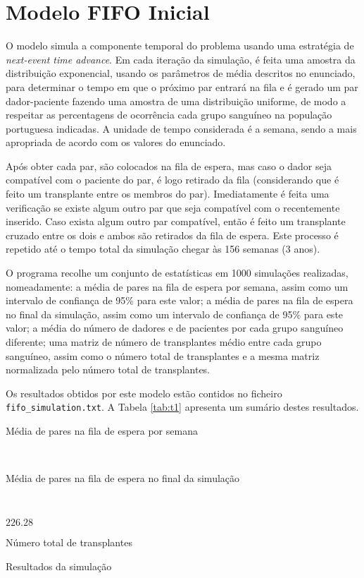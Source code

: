 \documentclass[10pt,a4paper,oneside]{article}
\begin{document}
\section{Modelo FIFO Inicial}
\label{sec:model1}

O modelo simula a componente temporal do problema usando uma
estratégia de \textit{next-event time advance}. Em cada iteração da
simulação, é feita uma amostra da distribuição exponencial, usando os
parâmetros de média descritos no enunciado, para determinar o tempo em
que o próximo par entrará na fila e é gerado um par dador-paciente
fazendo uma amostra de uma distribuição uniforme, de modo a respeitar
as percentagens de ocorrência cada grupo sanguíneo na população
portuguesa indicadas. A unidade de tempo considerada é a semana, sendo
a mais apropriada de acordo com os valores do enunciado.

Após obter cada par, são colocados na fila de espera, mas caso o dador
seja compatível com o paciente do par, é logo retirado da fila
(considerando que é feito um transplante entre os membros do
par). Imediatamente é feita uma verificação se existe algum outro par
que seja compatível com o recentemente inserido. Caso exista algum
outro par compatível, então é feito um transplante cruzado entre os
dois e ambos são retirados da fila de espera. Este processo é repetido
até o tempo total da simulação chegar às 156 semanas (3 anos).

O programa recolhe um conjunto de estatísticas em 1000 simulações
realizadas, nomeadamente: a média de pares na fila de espera por
semana, assim como um intervalo de confiança de 95\% para este valor;
a média de pares na fila de espera no final da simulação, assim como
um intervalo de confiança de 95\% para este valor; a média do número
de dadores e de pacientes por cada grupo sanguíneo diferente; uma
matriz de número de transplantes médio entre cada grupo sanguíneo,
assim como o número total de transplantes e a mesma matriz normalizada
pelo número total de transplantes.

Os resultados obtidos por este modelo estão contidos no ficheiro
\texttt{fifo\_simulation.txt}. A Tabela \ref{tab:t1} apresenta um
sumário destes resultados.

\begin{table}[h]
  \centering
  \begin{subtable}[h]{0.3\textwidth}
    \caption{Média de pares na fila de espera por semana}
  \end{subtable}
  ~
  \begin{subtable}[h]{0.3\textwidth}
    \caption{Média de pares na fila de espera no final da simulação}
  \end{subtable}
  ~
  \begin{subtable}[h]{0.3\textwidth}
    \centering
    $226.28$
    \caption{Número total de transplantes}
  \end{subtable}

  \caption{Resultados da simulação}
  \label{tab:t1}
\end{table}
\end{document}

